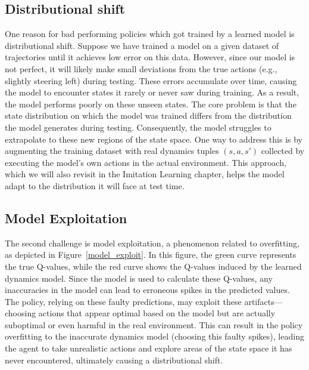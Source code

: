 \subsection{Distributional shift}
One reason for bad performing policies which got trained by a learned model is 
distributional shift. Suppose we have trained a model on a given dataset of trajectories 
until it achieves low error on this data. However, since our model is not perfect, it will 
likely make small deviations from the true actions (e.g., slightly steering left) during 
testing. These errors accumulate over time, causing the model to encounter states it 
rarely or never saw during training. As a result, the model performs poorly on these 
unseen states.\newline
The core problem is that the state distribution on which the model was trained differs from the distribution the model generates 
during testing. Consequently, the model struggles to extrapolate to these new regions of the state space. One way to address this 
is by augmenting the training dataset with real dynamics tuples $(s,a,s')$ collected by executing the model’s own actions in the 
actual environment. This approach, which we will also revisit in the Imitation Learning chapter, helps the model adapt to the 
distribution it will face at test time.

\subsection{Model Exploitation}
The second challenge is model exploitation, a phenomenon related to overfitting, as depicted in Figure~\ref{model_exploit}. In 
this figure, the green curve represents the true Q-values, while the red curve shows the Q-values induced by the learned dynamics 
model. Since the model is used to calculate these Q-values, any inaccuracies in the model can lead to erroneous spikes in the 
predicted values. The policy, relying on these faulty predictions, may exploit these artifacts—choosing actions that appear 
optimal based on the model but are actually suboptimal or even harmful in the real environment. This can result in the policy 
overfitting to the inaccurate dynamics model (choosing this faulty spikes), leading the agent to take unrealistic actions and 
explore areas of the state space it has never encountered, ultimately causing a distributional shift.


